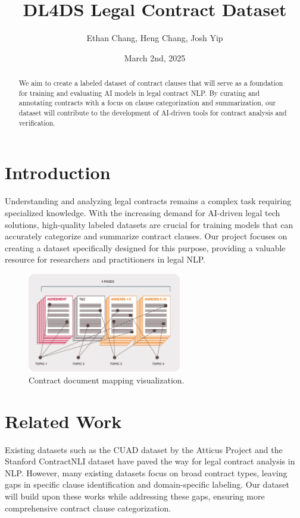 \documentclass[11pt, oneside]{article}   	%
\title{DL4DS Legal Contract Dataset}
\author{Ethan Chang, Heng Chang, Josh Yip}
\date{March 2nd, 2025}		%
\begin{document}
\maketitle
\begin{abstract}
We aim to create a labeled dataset of contract clauses that will serve as a foundation for 
training and evaluating AI models in legal contract NLP. By curating and annotating contracts with a focus on clause categorization and summarization, our dataset will contribute to the development of AI-driven tools for contract analysis and verification.
\end{abstract}



\section*{Introduction}
Understanding and analyzing legal contracts remains a complex task requiring specialized knowledge. With the increasing demand for AI-driven legal tech solutions, high-quality labeled datasets are crucial for training models that can accurately categorize and summarize contract clauses. Our project focuses on creating a dataset specifically designed for this purpose, providing a valuable resource for researchers and practitioners in legal NLP.

\begin{figure}[h]
    \centering
    \includegraphics[width=0.6\textwidth]{image.png}
    \caption{Contract document mapping visualization.}
    \label{fig:contract-doc-map}
\end{figure}


\section*{Related Work}
Existing datasets such as the CUAD dataset by the Atticus Project and the Stanford ContractNLI dataset have paved the way for legal contract analysis in NLP. However, many existing datasets focus on broad contract types, leaving gaps in specific clause identification and domain-specific labeling. Our dataset will build upon these works while addressing these gaps, ensuring more comprehensive contract clause categorization.
\end{document}
